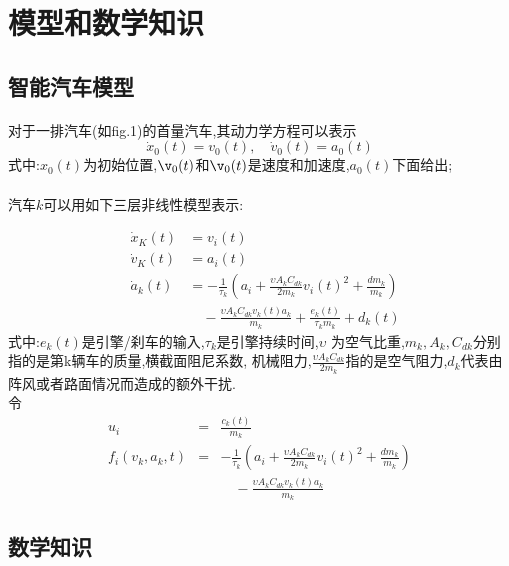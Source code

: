 \documentclass{cjc}
\begin{document}
\section{模型和数学知识}

  \subsection{智能汽车模型}
  \paragraph{}对于一排汽车(如fig.1)的首量汽车,其动力学方程可以表示\:
  \begin{equation} \dot{x}_0(t)=v_0(t),\quad \dot{v}_0(t)=a_0(t) \end{equation}
  式中:$x_0(t)$为初始位置,$\v_0(t)$和$\v_0(t)$是速度和加速度,$a_0(t)$下面给出;
  \paragraph{}汽车$k$可以用如下三层非线性模型表示:
  
  \begin{eqnarray}
    &\dot{x}_K(t) &= v_i(t) \nonumber \\
    &\dot{v}_K(t) &= a_i(t) \nonumber \\
    &\dot{a}_k(t) &=-\frac{1}{\tau_k}(a_i+\frac{\upsilon A_k C_{dk}}{2m_k} v_i(t)^2+\frac{dm_k}{m_k}) \nonumber \\
    &&\quad  -\frac{\upsilon A_k C_{dk} v_k(t) a_k}{m_k} + \frac{e_k(t)}{\tau_k m_k}+d_k(t)    
  \end{eqnarray}
  式中:$e_k (t)$是引擎/刹车的输入,$\tau _k$是引擎持续时间,$\upsilon$ 为空气比重,$m_k,A_k,C_{dk}$分别指的是第k辆车的质量,横截面阻尼系数,
  机械阻力,$\frac{\upsilon A_k C_{dk}}{2m_k}$指的是空气阻力,$d_k$代表由阵风或者路面情况而造成的额外干扰.\\
  令
  \begin{eqnarray}
    u_i &=& \frac{c_k(t)}{m_k} \nonumber \\
    f_i(v_k,a_k,t) &=& -\frac{1}{\tau _k}(a_i+\frac{\upsilon A_k C_{dk}}{2m_k} v_i(t)^2+\frac{dm_k}{m_k}) \nonumber \\
    &&\quad -\frac{\upsilon A_k C_{dk} v_k(t) a_k}{m_k}
    \end{eqnarray}


    \subsection{数学知识}
\end{document}
